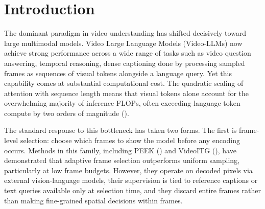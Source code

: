 \documentclass[12pt]{article}
\begin{document}
\begin{abstract}
    Our contributions are: (1) a training signal derived from model-internal language-to-video attention at empirically validated critical layers, requiring no caption alignment, no reward model, and no architectural modification; (2) input-level token gating that prunes the merged visual tokens before the language-model decoder, saving full-depth LLM compute rather than pruning at an intermediate layer as attention-based methods do; (3) stratified temporal selection ensuring coverage-aware retention without merging or architectural overhead; and (4) an empirical finding that norm-based heuristics reliably identify uninformative tokens but fail to identify important ones, directly motivating the need for a learned selector. This work extends our prior result (\cite{dave2026adaptivetokenisationtemporalredundancy}) that motion-based heuristics suffice for video compression but are structurally insufficient for understanding
\end{abstract}

\section{Introduction}


The dominant paradigm in video understanding has shifted decisively toward large multimodal models. Video Large Language Models (Video-LLMs) now achieve strong performance across a wide range of tasks such as video question answering, temporal reasoning, dense captioning done by processing sampled frames as sequences of visual tokens alongside a language query. Yet this capability comes at substantial computational cost. The quadratic scaling of attention with sequence length means that visual tokens alone account for the overwhelming majority of inference FLOPs, often exceeding language token compute by two orders of magnitude (\cite{gou2025empiricalstudyvideollmsanswer}).

The standard response to this bottleneck has taken two forms. The first is frame-level selection: choose which frames to show the model before any encoding occurs. Methods in this family, including PEEK (\cite{steunou2026peekpickingessentialframes}) and VideoITG (\cite{wang2026videoitgmultimodalvideounderstanding}), have demonstrated that adaptive frame selection outperforms uniform sampling, particularly at low frame budgets. However, they operate on decoded pixels via external vision-language models, their supervision is tied to reference captions or text queries available only at selection time, and they discard entire frames rather than making fine-grained spatial decisions within frames.
\end{document}
